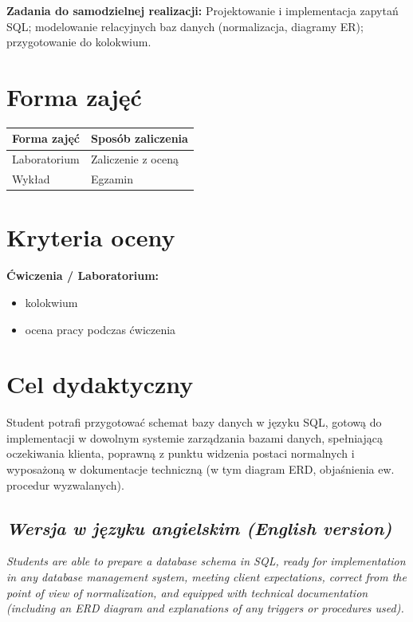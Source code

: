 \documentclass[12pt, a4paper]{article}
\newcommand{\thdrule}{\noalign{\global\setlength{\extrarowheight}{0pt}}}
\newcommand{\thdend}{\noalign{\global\setlength{\extrarowheight}{3pt}}}
\begin{document}
\vspace{4pt}
\noindent\textbf{Zadania do samodzielnej realizacji:} Projektowanie i implementacja zapytań SQL; modelowanie relacyjnych baz danych (normalizacja, diagramy ER); przygotowanie do kolokwium.

\section{Forma zajęć}

\begin{center}
{\scriptsize
\begin{tabular}{m{5cm}m{8cm}}
\thdrule\toprule
\rowcolor{pjatkRed} {\color{white}\textbf{Forma zajęć}} & {\color{white}\textbf{Sposób zaliczenia}} \\
\midrule\thdend
  \rowcolor{tableRowLight} Laboratorium & Zaliczenie z oceną \\
  \rowcolor{tableRowAlt} Wykład & Egzamin \\
\bottomrule
\end{tabular}}
\end{center}

\section{Kryteria oceny}

\textbf{Ćwiczenia / Laboratorium:}
\begin{itemize}
  \item kolokwium
  \item ocena pracy podczas ćwiczenia
\end{itemize}


\section{Cel dydaktyczny}

Student potrafi przygotować schemat bazy danych w języku SQL, gotową do implementacji w dowolnym systemie zarządzania bazami danych, spełniającą oczekiwania klienta, poprawną z punktu widzenia postaci normalnych i wyposażoną w dokumentacje techniczną (w tym diagram ERD, objaśnienia ew. procedur wyzwalanych).

\subsection*{\textit{Wersja w języku angielskim (English version)}}

\textit{Students are able to prepare a database schema in SQL, ready for implementation in any database management system, meeting client expectations, correct from the point of view of normalization, and equipped with technical documentation (including an ERD diagram and explanations of any triggers or procedures used).}
\end{document}
